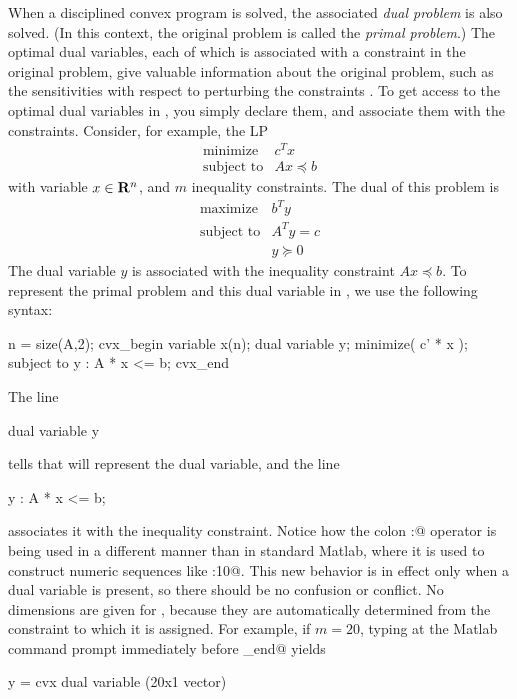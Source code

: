 \documentclass[12pt]{article}
\begin{document}
When a disciplined convex program is solved, the associated 
\emph{dual problem} is also solved.
(In this context, the original problem is called the \emph{primal
problem}.)
The optimal dual variables, each of which is associated with a 
constraint in the original problem,
give valuable information about the original problem,
such as the sensitivities with respect to perturbing the constraints
\cite[Ch.5]{BV:04}.
To get access to the optimal dual variables in \cvx, you 
simply declare them, and associate them with the constraints.
Consider, for example, the LP
\[
\begin{array}{llcll}
\mbox{minimize} & c^Tx \\
\mbox{subject to} & Ax \preceq b
\end{array}
\]
with variable $x\in\mathbf{R}^{n}$, and $m$ inequality constraints.
The dual of this problem is
\[
\begin{array}{llcll}
\mbox{maximize} & b^T y \\
\mbox{subject to} & A^T y = c \\ & y \succeq 0
\end{array}
\]
The dual variable $y$ is associated with the inequality
constraint $Ax\preceq b$. To represent the primal problem and 
this dual variable in \cvx, we use the following syntax:
\begin{code}
	n = size(A,2);
	cvx_begin
	    variable x(n);
	    dual variable y;
	    minimize( c' * x );
	    subject to
	        y : A * x <= b;
	cvx_end
\end{code}	
The line 
\begin{code}
	dual variable y
\end{code}
tells \cvx that \verb@y@ will represent the dual variable, and the line
\begin{code}
	y : A * x <= b;
\end{code}
associates it with the inequality constraint. Notice how the
colon \verb@:@ operator is being used in a different manner than 
in standard Matlab, where it is used to construct numeric sequences
like :10@.  This new behavior is in effect only
when a dual variable is present, so there should be no confusion 
or conflict. No dimensions are given
for \verb@y@, because they are automatically determined from the constraint
to which it is assigned. For example, if $m=20$, typing \verb@y@ at
the Matlab command prompt immediately before \verb@cvx_end@ yields
\begin{code}
y =
    cvx dual variable (20x1 vector)
\end{code}
\end{document}
